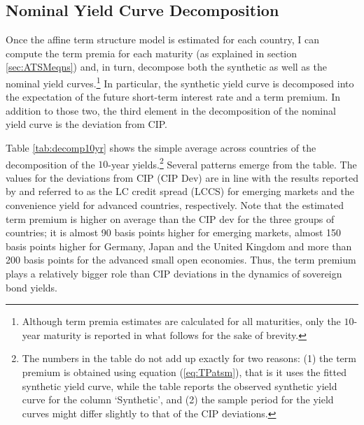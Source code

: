 {%

\subsection{Nominal Yield Curve Decomposition}
Once the affine term structure model is estimated for each country, I can compute the term premia for each maturity (as explained in section \ref{sec:ATSMeqns}) and, in turn, decompose both the synthetic as well as the nominal yield curves.\footnote{Although term premia estimates are calculated for all maturities, only the $10$-year maturity is reported in what follows for the sake of brevity.} In particular, the synthetic yield curve is decomposed into the expectation of the future short-term interest rate and a term premium. In addition to those two, the third element in the decomposition of the nominal yield curve is the deviation from CIP.

Table \ref{tab:decomp10yr} shows the simple average across countries of the decomposition of the $10$-year yields.\footnote{The numbers in the table do not add up exactly for two reasons: (1) the term premium is obtained using equation (\ref{eq:TPatsm}), that is it uses the fitted synthetic yield curve, while the table reports the observed synthetic yield curve for the column `Synthetic', and (2) the sample period for the yield curves might differ slightly to that of the CIP deviations.} Several patterns emerge from the table. The values for the deviations from CIP (CIP Dev) are in line with the results reported by \cite{DuSchreger:2016JoF} and \cite{DuImSchreger:2018JIE} referred to as the LC credit spread (LCCS) for emerging markets and the convenience yield for advanced countries, respectively. Note that the estimated term premium is higher on average than the CIP dev for the three groups of countries; it is almost 90 basis points higher for emerging markets, almost 150 basis points higher for Germany, Japan and the United Kingdom and more than 200 basis points for the advanced small open economies. Thus, the term premium plays a relatively bigger role than CIP deviations in the dynamics of sovereign bond yields. %
	
%	

}

